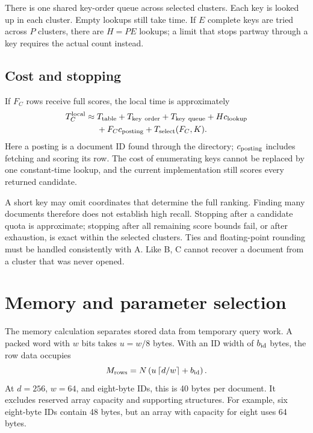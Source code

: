 \documentclass[11pt,a4paper]{article}
\newcommand{\ceil}[1]{\left\lceil #1\right\rceil}
\begin{document}
There is one shared key-order queue across selected clusters. Each key is looked up in
each cluster. Empty lookups still take time. If $E$ complete keys are tried across $P$
clusters, there are $H=PE$ lookups; a limit that stops partway through a key requires the
actual count instead.

\subsection{Cost and stopping}
If $F_C$ rows receive full scores, the local time is approximately
\begin{equation}
\begin{split}
 T_C^{\rm local}\approx{}&T_{\rm table}+T_{\rm key\ order}+T_{\rm key\ queue}
 +Hc_{\rm lookup}\\
 &+F_Cc_{\rm posting}+T_{\rm select}(F_C,K).
\end{split}
\label{eq:c}
\end{equation}
Here a posting is a document ID found through the directory; $c_{\rm posting}$ includes
fetching and scoring its row. The cost of enumerating keys cannot be replaced by one
constant-time lookup, and the current implementation still scores every returned candidate.

A short key may omit coordinates that determine the full ranking. Finding many documents
therefore does not establish high recall. Stopping after a candidate quota is approximate;
stopping after all remaining score bounds fail, or after exhaustion, is exact within the
selected clusters. Ties and floating-point rounding must be handled consistently with A.
Like B, C cannot recover a document from a cluster that was never opened.

\newpage
\section{Memory and parameter selection}
The memory calculation separates stored data from temporary query work. A packed word with
$w$ bits takes $u=w/8$ bytes. With an ID width of $b_{\rm id}$ bytes, the row data occupies
\begin{equation}
 M_{\rm rows}=N\left(u\ceil{d/w}+b_{\rm id}\right).
\end{equation}
At $d=256$, $w=64$, and eight-byte IDs, this is 40 bytes per document. It excludes reserved
array capacity and supporting structures. For example, six eight-byte IDs contain 48 bytes,
but an array with capacity for eight uses 64 bytes.
\end{document}
